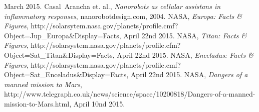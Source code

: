 \begin{thebibliography}{99}
		March 2015.
		Casal\, Arancha et. al.,
		\emph{Nanorobots as cellular assistans in inflammatory responses},
		nanorobotdesign.com,
		2004.
		NASA,
		\emph{Europa: Facts \& Figures},
		http://solarsytem.nasa.gov/planets/profile.cmf?Object=Jup\_Europa\&Display=Facts,
		April 22nd 2015.
		NASA,
		\emph{Titan: Facts \& Figures},
		http://solarsystem.nasa.gov/planets/profile.cfm?Object=Sat\_Titan\&Display=Facts,
		April 22nd 2015.
		NASA,
		\emph{Enceladus: Facts \& Figures},
		http://solarsystem.nasa.gov/planets/profile.cmf?Object=Sat\_Enceladus\&Display=Facts,
		April 22nd 2015.
		NASA,
		\emph{Dangers of a manned mission to Mars},
		http://www.telegraph.co.uk/news/science/space/10200818/Dangers-of-a-manned-mission-to-Mars.html,
		April 10nd 2015.
\end{thebibliography}